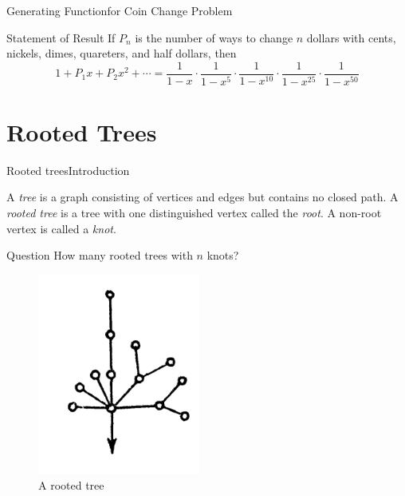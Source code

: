 \documentclass{beamer}
\begin{document}
    \begin{frame}{Generating Function}{for Coin Change Problem}
        \begin{block}{Statement of Result}
        If $P_n$ is the number of ways to change $n$ dollars with 
        cents, nickels, dimes, quareters, and half dollars, then 
        \begin{equation*}
            1+P_1x + P_2x^2 + \cdots = \frac{1}{1-x}\cdot\frac{1}{1-x^5}\cdot\frac{1}{1-x^{10}}\cdot\frac{1}{1-x^{25}}\cdot\frac{1}{1-x^{50}}
        \end{equation*}
            
        \end{block}
    \end{frame}


    \section{Rooted Trees}
    \begin{frame}{Rooted trees}{Introduction}
        \begin{definition}
            A \emph{tree} is a graph consisting of vertices and edges 
            but contains no closed path. A \emph{rooted tree} is a tree with one distinguished vertex called the \emph{root}. A non-root vertex is called a \emph{knot}.
        \end{definition}
        \begin{block}{Question}
            How many rooted trees with $n$ knots?
        \end{block}
        \begin{figure}
            \centering
            \includegraphics[scale=0.5]{images/rooted-tree.png}
            \caption{A rooted tree}
            \label{fig:enter-label}
        \end{figure}
    \end{frame}
\end{document}

